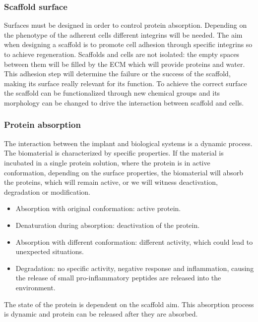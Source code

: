 		\subsubsection{Scaffold surface}
		Surfaces must be designed in order to control protein absorption.
		Depending on the phenotype of the adherent cells different integrins will be needed.
		The aim when designing a scaffold is to promote cell adhesion through specific integrins so to achieve regeneration.
		Scaffolds and cells are not isolated: the empty spaces between them will be filled by the ECM which will provide proteins and water.
		This adhesion step will determine the failure or the success of the scaffold, making its surface really relevant for its function.
		To achieve the correct surface the scaffold can be functionalized through new chemical groups and its morphology can be changed to drive the interaction between scaffold and cells.

		\subsubsection{Protein absorption}
		The interaction between the implant and biological systems is a dynamic process.
		The biomaterial is characterized by specific properties.
		If the material is incubated in a single protein solution, where the protein is in active conformation, depending on the surface properties, the biomaterial will absorb the proteins, which will remain active, or we will witness deactivation, degradation or modification.

		\begin{multicols}{2}
			\begin{itemize}
				\item Absorption with original conformation: active protein.
				\item Denaturation during absorption: deactivation of the protein.
				\item Absorption with different conformation: different activity, which could lead to unexpected situations.
				\item Degradation: no specific activity, negative response and inflammation, causing the release of small pro-inflammatory peptides are released into the environment.
			\end{itemize}
		\end{multicols}

		The state of the protein is dependent on the scaffold aim.
		This absorption process is dynamic and protein can be released after they are absorbed.

